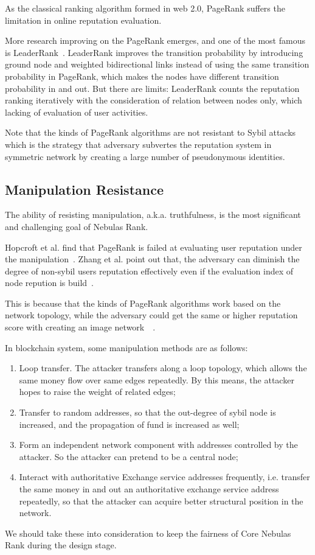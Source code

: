 As the classical ranking algorithm formed in web 2.0, PageRank suffers the limitation in online reputation evaluation.


More research improving on the PageRank emerges, and one of the most famous is LeaderRank~\cite{Li2014}. LeaderRank improves the transition probability by introducing ground node and weighted bidirectional links instead of using the same transition probability in PageRank, which makes the nodes have different transition probability in and out. But there are limits: LeaderRank counts the reputation ranking iteratively with the consideration of relation between nodes only, which lacking of evaluation of user activities. 


Note that the kinds of PageRank algorithms are not resistant to Sybil attacks~\cite{cheng2006manipulability} which is the strategy that adversary subvertes the reputation system in symmetric network by creating a large number of pseudonymous identities.


\subsection{Manipulation Resistance}
The ability of resisting manipulation, a.k.a. truthfulness, is the most significant and challenging goal of Nebulas Rank. 

Hopcroft et al. find that PageRank is failed at evaluating user reputation under the manipulation~\cite{hopcroft2007manipulation}. Zhang et al. point out that, the adversary can diminish the degree of non-sybil users reputation effectively even if the evaluation index of node repution is build~\cite{zhang2016truetop}.

This is because that the kinds of PageRank algorithms work based on the network topology, while the adversary could get the same or higher reputation score with creating an image network~\cite{cheng2005sybilproof}~\cite{cheng2006manipulability}.

In blockchain system, some manipulation methods are as follows:
\begin{enumerate}
\item Loop transfer. The attacker transfers along a loop topology, which allows the same money flow over same edges repeatedly. By this means, the attacker hopes to raise the weight of related edges;
\item Transfer to random addresses, so that the out-degree of sybil node is increased, and the propagation of fund is increased as well;
\item Form an independent network component with addresses controlled by the attacker. So the attacker can pretend to be a central node;
\item Interact with authoritative Exchange service addresses frequently, i.e. transfer the same money in and out an authoritative exchange service address repeatedly, so that the attacker can acquire better structural position in the network.
\end{enumerate}

We should take these into consideration to keep the fairness of Core Nebulas Rank during the design stage.

